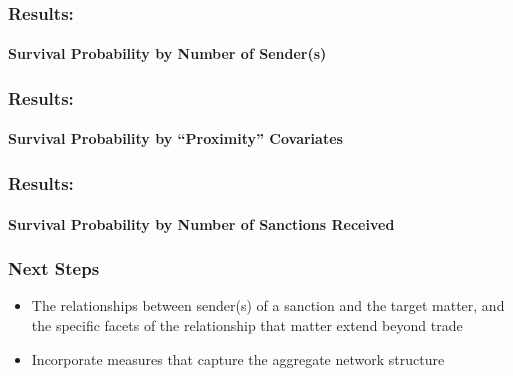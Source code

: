 \begin{frame}
\frametitle{Results:}
\framesubtitle{Survival Probability by Number of Sender(s)}

\begin{figure}[ht]
	\centering
	\resizebox{1\textwidth}{!}{}	
\end{figure}

\end{frame}

\begin{frame}
\frametitle{Results:}
\framesubtitle{Survival Probability by ``Proximity'' Covariates}

\begin{figure}[ht]
	\centering
	\resizebox{1\textwidth}{!}{}	
\end{figure}

\end{frame}

\begin{frame}
\frametitle{Results:}	
\framesubtitle{Survival Probability by Number of Sanctions Received}

\begin{figure}[ht]
	\centering
	\resizebox{1\textwidth}{!}{}	
\end{figure}

\end{frame}

\begin{frame}
\frametitle{Next Steps}

\begin{itemize}
	\item The relationships between sender(s) of a sanction and the target matter, and the specific facets of the relationship that matter extend beyond trade
	\item Incorporate measures that capture the aggregate network structure
\end{itemize}
\end{frame}
